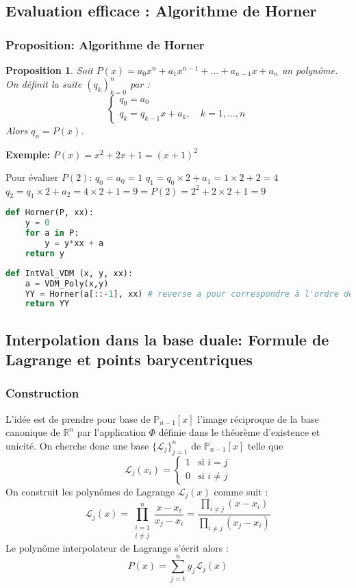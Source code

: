 \documentclass{article}
\newtheorem{proposition}[theorem]{Proposition}
\begin{document}
\subsection{Evaluation efficace : Algorithme de Horner}

\subsubsection{Proposition: Algorithme de Horner}

\begin{proposition}
Soit $P(x) = a_0 x^n + a_1 x^{n-1} + \dots + a_{n-1} x + a_n$ un polynôme.
On définit la suite $(q_k)_{k=0}^n$ par :
\[
\begin{cases}
q_0 = a_0 \\
q_k = q_{k-1} x + a_k, \quad k=1, \dots, n
\end{cases}
\]
Alors $q_n = P(x)$.
\end{proposition}

\textbf{Exemple: } $P(x) = x^2 + 2x + 1 = (x+1)^2$

Pour évaluer $P(2)$:
$q_0 = a_0 = 1$
$q_1 = q_0 \times 2 + a_1 = 1 \times 2 + 2 = 4$
$q_2 = q_1 \times 2 + a_2 = 4 \times 2 + 1 = 9 = P(2) = 2^2 + 2 \times 2 + 1 = 9$

\begin{lstlisting}[language=Python]
def Horner(P, xx):
    y = 0
    for a in P:
        y = y*xx + a
    return y
\end{lstlisting}

\begin{lstlisting}[language=Python]
def IntVal_VDM (x, y, xx):
    a = VDM_Poly(x,y)
    YY = Horner(a[::-1], xx) # reverse a pour correspondre à l'ordre des coefficients dans Horner
    return YY
\end{lstlisting}


\subsection{Interpolation dans la base duale: Formule de Lagrange et points barycentriques}

\subsubsection{Construction}

L'idée est de prendre pour base de $\mathbb{P}_{n-1}[x]$ l'image réciproque de la base canonique de $\mathbb{R}^n$ par l'application $\Phi$ définie dans le théorème d'existence et unicité.
On cherche donc une base $\{\mathcal{L}_j\}_{j=1}^n$ de $\mathbb{P}_{n-1}[x]$ telle que
\[
\mathcal{L}_j(x_i) = \begin{cases} 1 & \text{si } i = j \\ 0 & \text{si } i \neq j \end{cases}
\]
On construit les polynômes de Lagrange $\mathcal{L}_j(x)$ comme suit :
\[
\mathcal{L}_j(x) = \prod_{\substack{i=1 \\ i \neq j}}^n \frac{x-x_i}{x_j-x_i} = \frac{\prod_{i \neq j} (x-x_i)}{\prod_{i \neq j} (x_j-x_i)}
\]
Le polynôme interpolateur de Lagrange s'écrit alors :
\[
P(x) = \sum_{j=1}^n y_j \mathcal{L}_j(x)
\]
\end{document}
